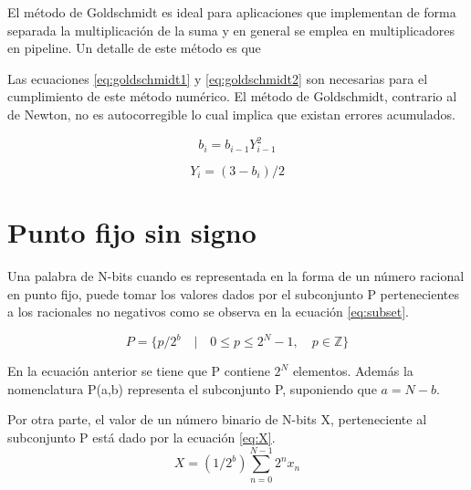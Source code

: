 El método de Goldschmidt es ideal para aplicaciones que implementan de forma separada la multiplicación de la suma y en general se emplea en multiplicadores en pipeline. Un detalle de este método es que 

Las ecuaciones \eqref{eq:goldschmidt1} y \eqref{eq:goldschmidt2} son necesarias para el cumplimiento de este método numérico. El método de Goldschmidt, contrario al de Newton, no es autocorregible lo cual implica que existan errores acumulados.

\begin{equation}
\label{eq:goldschmidt1}
  b_{i}=b_{i-1}Y_{i-1}^{2}
\end{equation}

\begin{equation}
\label{eq:goldschmidt2}
  Y_{i}=(3-b_{i})/2
\end{equation}
  




\section{Punto fijo sin signo}

Una palabra de N-bits cuando es representada en la forma de un número racional en punto fijo, puede tomar los valores dados por el subconjunto P pertenecientes a los racionales no negativos como se observa en la ecuación \eqref{eq:subset}.

\begin{equation}
\label{eq:subset}
	P = \{p/2^{b}\quad |\quad 0 \leq p \leq 2^{N}-1, \quad p \in \mathbb{Z}\}
\end{equation}

En la ecuación anterior se tiene que P contiene $2^{N}$ elementos. Además la nomenclatura P(a,b) representa el subconjunto P, suponiendo que $a=N-b$.

Por otra parte, el valor de un número binario de N-bits X, perteneciente al subconjunto P está dado por la ecuación \eqref{eq:X}.
\begin{equation}
\label{eq:X}
   X = (1/2^{b}){\sum^{N-1}_{n=0}} 2^{n} x_{n}
\end{equation}

